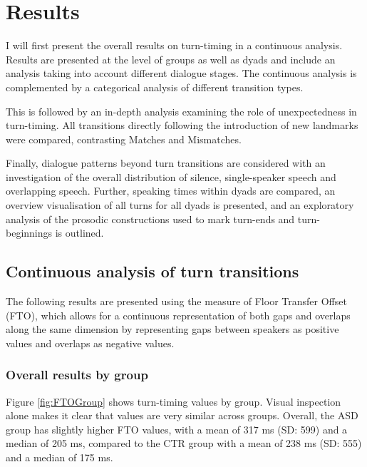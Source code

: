 \section{Results}\label{sec:turntaking_results}

I will first present the overall results on turn-timing in a continuous analysis. Results are presented at the level of groups as well as dyads and include an analysis taking into account different dialogue stages. The continuous analysis is complemented by a categorical analysis of different transition types.

This is followed by an in-depth analysis examining the role of unexpectedness in turn-timing. All transitions directly following the introduction of new landmarks were compared, contrasting Matches and Mismatches.

Finally, dialogue patterns beyond turn transitions are considered with an investigation of the overall distribution of silence, single-speaker speech and overlapping speech. Further, speaking times within dyads are compared, an overview visualisation of all turns for all dyads is presented, and an exploratory analysis of the prosodic constructions used to mark turn-ends and turn-beginnings is outlined.



\subsection{Continuous analysis of turn transitions}\label{turntaking_results_FTO}

The following results are presented using the measure of Floor Transfer Offset (FTO), which allows for a continuous representation of both gaps and overlaps along the same dimension by representing gaps between speakers as positive values and overlaps as negative values.

\subsubsection{Overall results by group}\label{turntaking_results_FTO_group}


Figure \ref{fig:FTOGroup} shows turn-timing values by group. Visual inspection alone makes it clear that values are very similar across groups. Overall, the ASD group has slightly higher FTO values, with a mean of 317 ms (SD: 599) and a median of 205 ms, compared to the CTR group with a mean of 238 ms (SD: 555) and a median of 175 ms.

